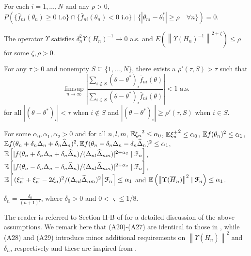 \begin{pvn}
\item For each $i=1,\ldots,N$ and any $\rho>0$, 
$P(\{ \bar f_{ni} (\theta_n) \ge 0 \text{ i.o}\} \cap \{ \bar f_{ni} (\theta_n) < 0 \text{ i.o}\} \mid \{ |\theta_{ni} - \theta^*_i| \ge \rho\quad \forall n\}) =0.$

\item The operator $\Upsilon$ satisfies $\delta_n^2 \Upsilon(H_n)^{-1} \rightarrow 0$ a.s. and  $E(\left\| \Upsilon(H_n)^{-1}\right\|^{2+\zeta}) \le \rho$ for some $\zeta, \rho>0$.

\item For any $\tau >0$ and nonempty $S \subseteq \{1,\ldots,N\}$, there exists a $\rho'(\tau,S)>\tau$ such that 
$$ \limsup_{n\rightarrow \infty} \left| \dfrac{\sum_{i \notin S} (\theta-\theta^*)_i \bar f_{ni}(\theta)}{\sum_{i \in S} (\theta-\theta^*)_i \bar f_{ni}(\theta)}               \right| < 1 \text{ a.s.}$$
for all $|(\theta-\theta^*)_i| < \tau$ when $i \notin S$ and $|(\theta-\theta^*)_i| \ge \rho'(\tau,S)$ when $i\in S$.
\item For some $\alpha_0, \alpha_1, \alpha_2 >0$ and for all $n,l,m$, $\mathbb{E} {\xi_n}^{2} \le \alpha_0$, $\mathbb{E} {\xi_n^{\pm}}^{2} \le \alpha_0$, $\mathbb{E} f(\theta_n)^{2} \le \alpha_1$,  $\mathbb{E} f(\theta_n + \delta_n \Delta_n + \delta_n \widehat \Delta_n)^{2},\mathbb{E} f(\theta_n - \delta_n \Delta_n - \delta_n \widehat \Delta_n)^{2} \le \alpha_1$, 
$\mathbb{E} \left[| f(\theta_n + \delta_n \Delta_n + \delta_n \widehat \Delta_n)/ (\Delta_{nl}\widehat\Delta_{nm})|^{2+\alpha_2} \mid \mathcal{F}_n\right]$,
$\mathbb{E} \left[ |f(\theta_n - \delta_n \Delta_n - \delta_n \widehat \Delta_n)/ (\Delta_{nl}\widehat\Delta_{nm})|^{2+\alpha_2} \mid \mathcal{F}_n\right]$,
 $\mathbb{E}\left[\left. (\xi_n^+ + \xi_n^- - 2 \xi_n)^2/(\Delta_{nl}\widehat\Delta_{nm})^2 \right| \mathcal{F}_n \right] \le \alpha_1$ 
and $\mathbb{E} \left(\left\| \Upsilon(\overline H_n) \right\|^2 \mid \mathcal{F}_n\right) \le \alpha_1$. 
\item  $\delta_n = \frac{\delta_0}{(n+1)^{\varsigma}}$, where $\delta_0 > 0$ and $0 < \varsigma \le 1/8$.
\end{pvn}
The reader is referred to Section II-B of \cite{prashanth2015rdsa} for a detailed discussion of the above assumptions. We remark here that (A20)-(A27) are identical to those in \cite{prashanth2015rdsa}, while (A28) and (A29) introduce minor additional requirements on $\left\| \Upsilon(\overline H_n) \right\|^2$ and $\delta_n$, respectively and these are inspired from \cite{spall-jacobian}.

